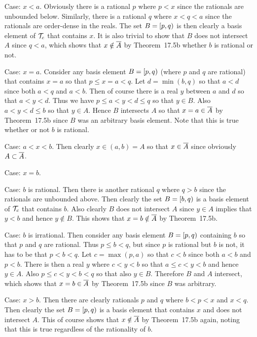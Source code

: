 {{    Case: $x < a$.
    Obviously there is a rational $p$ where $p < x$ since the rationals are unbounded below.
    Similarly, there is a rational $q$ where $x < q < a$ since the rationals are order-dense in the reals.
    The set $B = [p,q)$ is then clearly a basis element of $\mathcal{T}_c$ that contains $x$.
    It is also trivial to show that $B$ does not intersect $A$ since $q < a$, which shows that $x \notin \overline{A}$ by Theorem~17.5b whether $b$ is rational or not.

    Case: $x = a$.
    Consider any basis element $B = [p,q)$ (where $p$ and $q$ are rational) that contains $x = a$ so that $p \leq x = a < q$.
    Let $d = \min(b,q)$ so that $a < d$ since both $a < q$ and $a < b$.
    Then of course there is a real $y$ between $a$ and $d$ so that $a < y < d$.
    Thus we have $p \leq a < y < d \leq q$ so that $y \in B$.
    Also $a < y < d \leq b$ so that $y \in A$.
    Hence $B$ intersects $A$ so that $x = a \in \overline{A}$ by Theorem~17.5b since $B$ was an arbitrary basis element.
    Note that this is true whether or not $b$ is rational.

    Case: $a < x < b$.
    Then clearly $x \in (a,b) = A$ so that $x \in \overline{A}$ since obviously $A \subset \overline{A}$.

    Case: $x = b$.
    \begin{indpar}
      Case: $b$ is rational.
      Then there is another rational $q$ where $q > b$ since the rationals are unbounded above.
      Then clearly the set $B = [b, q)$ is a basis element of $\mathcal{T}_c$ that contains $b$.
      Also clearly $B$ does not intersect $A$ since $y \in A$ implies that $y < b$ and hence $y \notin B$.
      This shows that $x = b \notin \overline{A}$ by Theorem~17.5b.

      Case: $b$ is irrational.
      Then consider any basis element $B = [p,q)$ containing $b$ so that $p$ and $q$ are rational.
      Thus $p \leq b < q$, but since $p$ is rational but $b$ is not, it has to be that $p < b < q$.
      Let $c = \max(p,a)$ so that $c < b$ since both $a < b$ and $p < b$.
      There is then a real $y$ where $c < y < b$ so that $a \leq c < y < b$ and hence $y \in A$.
      Also $p \leq c < y < b < q$ so that also $y \in B$.
      Therefore $B$ and $A$ intersect, which shows that $x = b \in \overline{A}$ by Theorem~17.5b since $B$ was arbitrary.
    \end{indpar}

    Case: $x > b$.
    Then there are clearly rationals $p$ and $q$ where $b < p < x$ and $x < q$.
    Then clearly the set $B = [p,q)$ is a basis element that contains $x$ and does not intersect $A$.
    This of course shows that $x \notin \overline{A}$ by Theorem~17.5b again, noting that this is true regardless of the rationality of $b$.

}}
